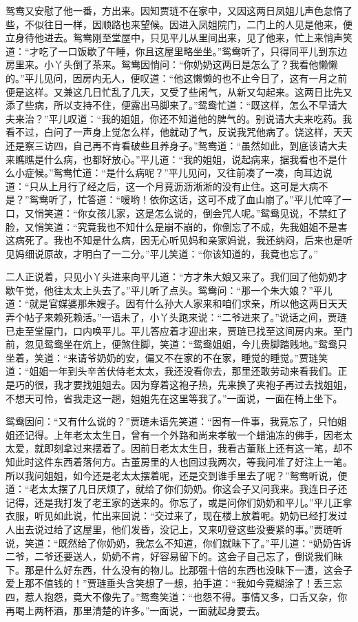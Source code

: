 鸳鸯又安慰了他一番，方出来。因知贾琏不在家中，又因这两日凤姐儿声色怠惰了些，不似往日一样，因顺路也来望候。因进入凤姐院门，二门上的人见是他来，便立身待他进去。鸳鸯刚至堂屋中，只见平儿从里间出来，见了他来，忙上来悄声笑道：“才吃了一口饭歇了午睡，你且这屋里略坐坐。”鸳鸯听了，只得同平儿到东边房里来。小丫头倒了茶来。鸳鸯因悄问：“你奶奶这两日是怎么了？我看他懒懒的。”平儿见问，因房内无人，便叹道：“他这懒懒的也不止今日了，这有一月之前便是这样。又兼这几日忙乱了几天，又受了些闲气，从新又勾起来。这两日比先又添了些病，所以支持不住，便露出马脚来了。”鸳鸯忙道：“既这样，怎么不早请大夫来治？”平儿叹道：“我的姐姐，你还不知道他的脾气的。别说请大夫来吃药。我看不过，白问了一声身上觉怎么样，他就动了气，反说我咒他病了。饶这样，天天还是察三访四，自己再不肯看破些且养身子。”鸳鸯道：“虽然如此，到底该请大夫来瞧瞧是什么病，也都好放心。”平儿道：“我的姐姐，说起病来，据我看也不是什么小症候。”鸳鸯忙道：“是什么病呢？”平儿见问，又往前凑了一凑，向耳边说道：“只从上月行了经之后，这一个月竟沥沥淅淅的没有止住。这可是大病不是？”鸳鸯听了，忙答道：“嗳哟！依你这话，这可不成了血山崩了。”平儿忙啐了一口，又悄笑道：“你女孩儿家，这是怎么说的，倒会咒人呢。”鸳鸯见说，不禁红了脸，又悄笑道：“究竟我也不知什么是崩不崩的，你倒忘了不成，先我姐姐不是害这病死了。我也不知是什么病，因无心听见妈和亲家妈说，我还纳闷，后来也是听见妈细说原故，才明白了一二分。”平儿笑道：“你该知道的，我竟也忘了。”

二人正说着，只见小丫头进来向平儿道：“方才朱大娘又来了。我们回了他奶奶才歇午觉，他往太太上头去了。”平儿听了点头。鸳鸯问：“那一个朱大娘？”平儿道：“就是官媒婆那朱嫂子。因有什么孙大人家来和咱们求亲，所以他这两日天天弄个帖子来赖死赖活。”一语未了，小丫头跑来说：“二爷进来了。”说话之间，贾琏已走至堂屋门，口内唤平儿。平儿答应着才迎出来，贾琏已找至这间房内来。至门前，忽见鸳鸯坐在炕上，便煞住脚，笑道：“鸳鸯姐姐，今儿贵脚踏贱地。”鸳鸯只坐着，笑道：“来请爷奶奶的安，偏又不在家的不在家，睡觉的睡觉。”贾琏笑道：“姐姐一年到头辛苦伏侍老太太，我还没看你去，那里还敢劳动来看我们。正是巧的很，我才要找姐姐去。因为穿着这袍子热，先来换了夹袍子再过去找姐姐，不想天可怜，省我走这一趟，姐姐先在这里等我了。”一面说，一面在椅上坐下。

鸳鸯因问：“又有什么说的？”贾琏未语先笑道：“因有一件事，我竟忘了，只怕姐姐还记得。上年老太太生日，曾有一个外路和尚来孝敬一个蜡油冻的佛手，因老太太爱，就即刻拿过来摆着了。因前日老太太生日，我看古董账上还有这一笔，却不知此时这件东西着落何方。古董房里的人也回过我两次，等我问准了好注上一笔。所以我问姐姐，如今还是老太太摆着呢，还是交到谁手里去了呢？”鸳鸯听说，便道：“老太太摆了几日厌烦了，就给了你们奶奶。你这会子又问我来。我连日子还记得，还是我打发了老王家的送来的。你忘了，或是问你们奶奶和平儿。”平儿正拿衣服，听见如此说，忙出来回说：“交过来了，现在楼上放着呢。奶奶已经打发过人出去说过给了这屋里，他们发昏，没记上，又来叨登这些没要紧的事。”贾琏听说，笑道：“既然给了你奶奶，我怎么不知道，你们就昧下了。”平儿道：“奶奶告诉二爷，二爷还要送人，奶奶不肯，好容易留下的。这会子自己忘了，倒说我们昧下。那是什么好东西，什么没有的物儿。比那强十倍的东西也没昧下一遭，这会子爱上那不值钱的！”贾琏垂头含笑想了一想，拍手道：“我如今竟糊涂了！丢三忘四，惹人抱怨，竟大不像先了。”鸳鸯笑道：“也怨不得。事情又多，口舌又杂，你再喝上两杯酒，那里清楚的许多。”一面说，一面就起身要去。

